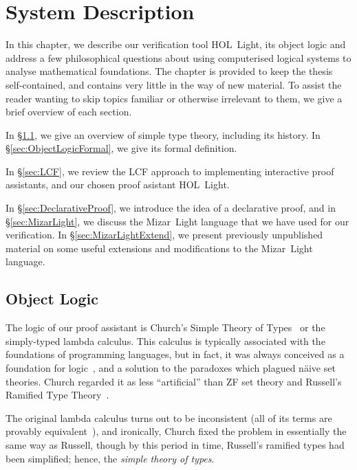 \chapter{System Description}\label{chapter:System}
In this chapter, we describe our verification tool HOL~Light, its object logic and address a few philosophical questions about using computerised logical systems to analyse mathematical foundations. The chapter is provided to keep the thesis self-contained, and contains very little in the way of new material. To assist the reader wanting to skip topics familiar or otherwise irrelevant to them, we give a brief overview of each section.

In \S\ref{sec:ObjectLogic}, we give an overview of simple type theory, including its history. In \S\ref{sec:ObjectLogicFormal}, we give its formal definition. 

In \S\ref{sec:LCF}, we review the LCF approach to implementing interactive proof assistants, and our chosen proof asistant HOL~Light. 

In \S\ref{sec:DeclarativeProof}, we introduce the idea of a declarative proof, and in \S\ref{sec:MizarLight}, we discuss the Mizar~Light language that we have used for our verification. In \S\ref{sec:MizarLightExtend}, we present previously unpublished material on some useful extensions and modifications to the Mizar~Light language.

\section{Object Logic}\label{sec:ObjectLogic}
The logic of our proof assistant is Church's Simple Theory of Types~\cite{ChurchTheoryOfTypes} or the simply-typed lambda calculus. This calculus is typically associated with the foundations of programming languages, but in fact, it was always conceived as a foundation for logic~\cite{UntypedTheoryLambdaCalculus}, and a solution to the paradoxes which plagued n\"{a}ive set theories. Church regarded it as less ``artificial'' than ZF set theory and Russell's Ramified Type Theory~\cite{RussellTheoryOfTypes}.

The original lambda calculus turns out to be inconsistent (all of its terms are provably equivalent~\cite{InconsistencyLambdaCalculus}), and ironically, Church fixed the problem in essentially the same way as Russell, though by this period in time, Russell's ramified types had been simplified; hence, the \emph{simple theory of types}.

